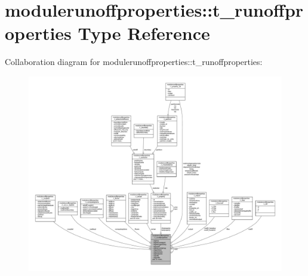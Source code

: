 \hypertarget{structmodulerunoffproperties_1_1t__runoffproperties}{}\section{modulerunoffproperties\+:\+:t\+\_\+runoffproperties Type Reference}
\label{structmodulerunoffproperties_1_1t__runoffproperties}


Collaboration diagram for modulerunoffproperties\+:\+:t\+\_\+runoffproperties\+:\nopagebreak
\begin{figure}[H]
\begin{center}
\leavevmode
\includegraphics[width=350pt]{structmodulerunoffproperties_1_1t__runoffproperties__coll__graph}
\end{center}
\end{figure}

